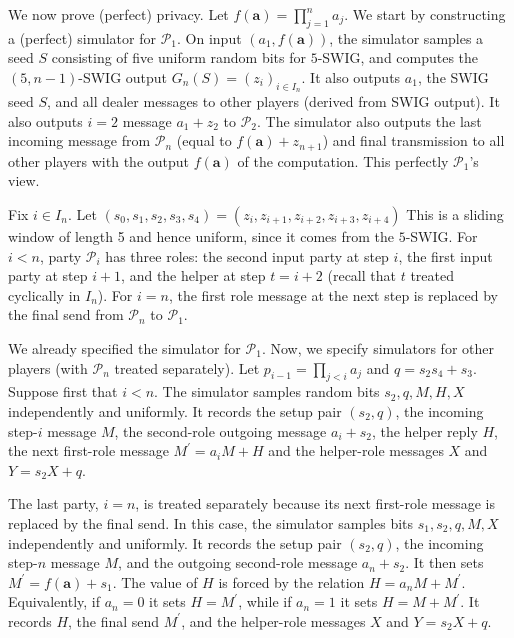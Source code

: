 We now prove (perfect) privacy. Let
$f(\mathbf{a})=\prod_{j=1}^{n}a_{j}$. We start by constructing a (perfect) simulator for $\mathcal{P}_{1}$. On input
$(a_{1},f(\mathbf{a}))$, the simulator samples a seed $S$ consisting of five uniform random bits for $5$-SWIG, and computes the $(5,n-1)$-SWIG output
$G_{n}(S)=(z_{i})_{i\in I_{n}}$. It also outputs $a_{1}$, the SWIG seed $S$, and all dealer messages to other players (derived from SWIG output). It also outputs
$i=2$ message $a_{1}+z_{2}$ to $\mathcal{P}_{2}$. The simulator also outputs the last incoming message from $\mathcal{P}_{n}$ (equal to
$f(\mathbf{a})+z_{n+1}$) and final transmission to all other players with the output $f(\mathbf{a})$ of the computation. This perfectly $\mathcal{P}_{1}$’s view.\par




Fix $i\in I_{n}$. Let
$(s_{0},s_{1},s_{2},s_{3},s_{4})=(z_{i},z_{i+1},z_{i+2},z_{i+3},z_{i+4})$
This is a sliding window of length 5 and hence uniform, since it comes from the $5$-SWIG. For $i<n$, party
$\mathcal{P}_{i}$ has three roles: the second input party at step $i$, the first
input party at step $i+1$, and the helper at step $t=i+2$ (recall that $t$
treated cyclically in $I_{n}$). For $i=n$, the first role message at the next
step is replaced by the final send from $\mathcal{P}_{n}$ to $\mathcal{P}_{1}$.\par




We already specified the simulator for $\mathcal{P}_{1}$. Now, we specify simulators for other players (with $\mathcal{P}_{n}$ treated separately).
Let $p_{i-1}=\prod_{j<i}a_{j}$ and $q=s_{2}s_{4}+s_{3}$.
Suppose first that $i<n$. The simulator samples random bits
$s_{2},q,M,H,X$ independently and uniformly. It records the setup
pair $(s_{2},q)$, the incoming step-$i$ message $M$, the second-role outgoing
message $a_{i}+s_{2}$, the helper reply $H$, the next first-role message
$M^{\prime}=a_{i}M+H$
and the helper-role messages $X$ and
$Y=s_{2}X+q$.\par




The last party, $i=n$, is treated separately because its next first-role message
is replaced by the final send. In this case, the simulator samples bits
$s_{1},s_{2},q,M,X$ independently and uniformly. It records the setup
pair $(s_{2},q)$, the incoming step-$n$ message $M$, and the outgoing
second-role message $a_{n}+s_{2}$. It then sets
$M^{\prime}=f(\mathbf{a})+s_{1}.$
The value of $H$ is forced by the relation $H=a_{n}M+M^{\prime}$. Equivalently, if
$a_{n}=0$ it sets $H=M^{\prime}$, while if $a_{n}=1$ it sets $H=M+M^{\prime}$. It records $H$, the
final send $M^{\prime}$, and the helper-role messages $X$ and $Y=s_{2}X+q$.\par





